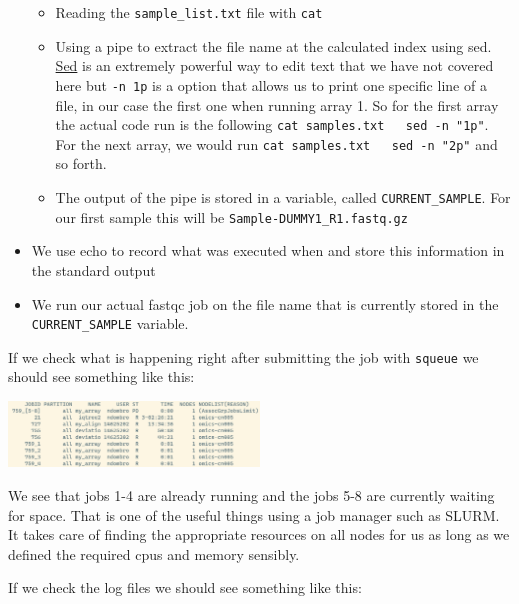 \documentclass[
  letterpaper,
  DIV=11,
  numbers=noendperiod]{scrreprt}
\providecommand{\tightlist}{%
  \setlength{\itemsep}{0pt}\setlength{\parskip}{0pt}}\usepackage{longtable,booktabs,array}
\begin{document}
\begin{tcolorbox}
\begin{itemize}
  \begin{itemize}
  \tightlist
  \item
    Reading the \texttt{sample\_list.txt} file with \texttt{cat}
  \item
    Using a pipe to extract the file name at the calculated index using
    sed.
    \href{https://scienceparkstudygroup.github.io/software_information/source/cli/cli_file_manipulation.html\#sed-manipulating-the-content-of-files}{Sed}
    is an extremely powerful way to edit text that we have not covered
    here but \texttt{-n\ 1p} is a option that allows us to print one
    specific line of a file, in our case the first one when running
    array 1. So for the first array the actual code run is the following
    \texttt{cat\ samples.txt\ \textbar{}\ \ sed\ -n\ "1p"}. For the next
    array, we would run
    \texttt{cat\ samples.txt\ \textbar{}\ \ sed\ -n\ "2p"} and so forth.
  \item
    The output of the pipe is stored in a variable, called
    \texttt{CURRENT\_SAMPLE}. For our first sample this will be
    \texttt{Sample-DUMMY1\_R1.fastq.gz}
  \end{itemize}
\item
  We use echo to record what was executed when and store this
  information in the standard output
\item
  We run our actual fastqc job on the file name that is currently stored
  in the \texttt{CURRENT\_SAMPLE} variable.
\end{itemize}

If we check what is happening right after submitting the job with
\texttt{squeue} we should see something like this:

\begin{center}
\includegraphics[width=0.5\textwidth,height=\textheight]{../img/arrays.png}
\end{center}

We see that jobs 1-4 are already running and the jobs 5-8 are currently
waiting for space. That is one of the useful things using a job manager
such as SLURM. It takes care of finding the appropriate resources on all
nodes for us as long as we defined the required cpus and memory
sensibly.

If we check the log files we should see something like this:


\end{tcolorbox}
\end{document}
